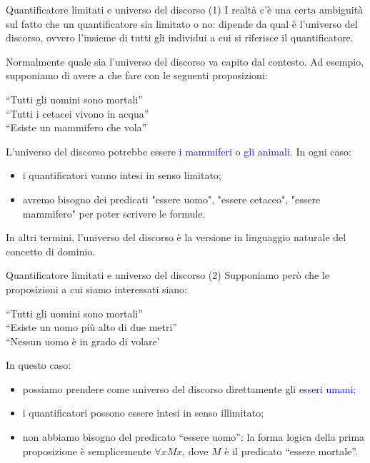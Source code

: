 \documentclass[aspectratio=169,10pt,dvipsnames,xcolor=table,handout]{beamer}
\begin{document}
\begin{frame}{Quantificatore limitati e universo del discorso (1)}
    I realtà c'è una certa ambiguità sul fatto che un quantificatore sia limitato o no: dipende da qual è l'\alert{universo del discorso}, ovvero l'insieme di tutti gli individui a cui si riferisce il quantificatore.

    \medskip
    Normalmente quale sia l'universo del discorso va capito dal contesto. Ad esempio, supponiamo di avere a che fare con le seguenti proposizioni:
    \begin{center}
        ``Tutti gli uomini sono mortali''\\
        ``Tutti i cetacei vivono in acqua''\\
        ``Esiste un mammifero che vola''
    \end{center}
    L'universo del discorso potrebbe essere \textcolor{blue}{i mammiferi} o \textcolor{blue}{gli animali}. In ogni caso:
    \begin{itemize}
        \item  i quantificatori vanno intesi in senso limitato;
        \item avremo bisogno dei predicati "essere uomo", "essere cetaceo", "essere mammifero" per poter scrivere le formule.
    \end{itemize}
    \medskip
    In altri termini, l'universo del discorso è la versione in linguaggio naturale del concetto di dominio.
\end{frame}

\begin{frame}{Quantificatore limitati e universo del discorso (2)}
    Supponiamo però che le proposizioni a cui siamo interessati siano:
    \begin{center}
        ``Tutti gli uomini sono mortali''\\
        ``Esiste un uomo più alto di due metri''\\
        ``Nessun uomo è in grado di volare'
    \end{center}
    In questo caso:
    \begin{itemize}
        \item possiamo prendere come universo del discorso direttamente gli \textcolor{blue}{esseri umani};
        \item i quantificatori possono essere intesi in senso illimitato;
        \item non abbiamo bisogno del predicato ``essere uomo'': la forma logica della prima proposizione è semplicemente $\forall x Mx$, dove $M$ è il predicato ``essere mortale''.
    \end{itemize}
\end{frame}
\end{document}
